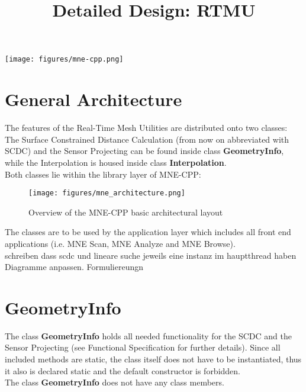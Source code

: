 





	
\title{Detailed Design: RTMU}
\vspace{3 in}
\maketitle

\texttt{[image: figures/mne-cpp.png]}

\clearpage


\tableofcontents

\clearpage
\section{General Architecture}
The features of the Real-Time Mesh Utilities are distributed onto two classes: The Surface Constrained Distance Calculation (from now on abbreviated with SCDC) and the Sensor Projecting can be found inside class \textbf{GeometryInfo}, while the Interpolation is housed inside class \textbf{Interpolation}.\\
Both classes lie within the library layer of MNE-CPP:

\begin{figure}[h]
	\begin{center}
		\texttt{[image: figures/mne\_architecture.png]}
		\caption{Overview of the MNE-CPP basic architectural layout}
	\end{center}
\end{figure}

The classes are to be used by the application layer which includes all front end applications (i.e. MNE Scan, MNE Analyze and MNE Browse).
\\

schreiben dass scdc und lineare suche jeweils eine instanz im hauptthread haben
Diagramme anpassen. Formuliereungn


\clearpage

\section{GeometryInfo}

The class \textbf{GeometryInfo} holds all needed functionality for the SCDC and the Sensor Projecting (see Functional Specification for further details). Since all included methods are static, the class itself does not have to be instantiated, thus it also is declared static and the default constructor is forbidden.\\
The class \textbf{GeometryInfo} does not have any class members.

